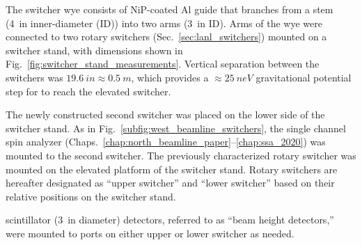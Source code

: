 The switcher wye consists of NiP-coated Al guide that branches from a stem (\qty{4}{in} inner-diameter (ID)) into two arms (\qty{3}{in} ID). Arms of the wye were connected to two rotary switchers (Sec.~\ref{sec:lanl_switchers}) mounted on a switcher stand, with dimensions shown in Fig.~\ref{fig:switcher_stand_measurements}. Vertical separation between the switchers was $\qty{19.6}{in}\approx \qty{0.5}{m}$, which provides a $\approx \qty{25}{neV}$ gravitational potential step for \ucn to reach the elevated switcher.

The newly constructed second switcher was placed on the lower side of the switcher stand. As in Fig.~\ref{subfig:west_beamline_switchers}, the single channel spin analyzer (Chaps.~\ref{chap:north_beamline_paper}--\ref{chap:ssa_2020}) was mounted to the second switcher. The previously characterized rotary switcher was mounted on the elevated platform of the switcher stand. Rotary switchers are hereafter designated as ``upper switcher'' and ``lower switcher'' based on their relative positions on the switcher stand.

\BZnS scintillator (\qty{3}{in} diameter) \ucn detectors, referred to as ``beam height detectors,'' were mounted to ports on either upper or lower switcher as needed.


